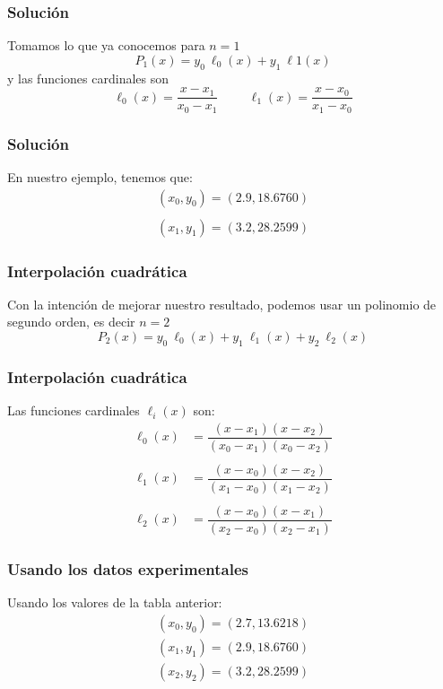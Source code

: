 \begin{frame}[fragile]
\frametitle{Solución}
Tomamos lo que ya conocemos para $n=1$
\[P_{1}(x) = y_{0} \: \ell_{0}(x) + y_{1} \: \ell{1}(x) \]
\pause
y las funciones cardinales son
\[ \ell_{0}(x) = \dfrac{x - x_{1}}{x_{0} - x_{1}} \hspace{1cm} \ell_{1}(x) = \dfrac{x - x_{0}}{x_{1} - x_{0}} \]
\end{frame}
\begin{frame}[fragile]
\frametitle{Solución}
En nuestro ejemplo, tenemos que:
\begin{align*}
(x_{0}, y_{0}) = (2.9, 18.6760) \\
\\
(x_{1}, y_{1}) = (3.2, 28.2599)
\end{align*}
\end{frame}
\begin{frame}
\frametitle{Interpolación cuadrática}
Con la intención de mejorar nuestro resultado, podemos usar un polinomio de segundo orden, es decir $n = 2$
\[P_{2}(x) = y_{0} \: \ell_{0}(x) + y_{1} \: \ell_{1}(x) + y_{2} \: \ell_{2}(x) \]
\end{frame}
\begin{frame}
\frametitle{Interpolación cuadrática}
Las funciones cardinales $\ell_{i}(x)$ son:
\begin{align*}
\ell_{0}(x) &= \dfrac{(x - x_{1})(x - x_{2})}{(x_{0} - x_{1})(x_{0} - x_{2})} \\
\\
\ell_{1}(x) &= \dfrac{(x - x_{0})(x - x_{2})}{(x_{1} - x_{0})(x_{1} - x_{2})} \\
\\
\ell_{2}(x) &= \dfrac{(x - x_{0})(x - x_{1})}{(x_{2} - x_{0})(x_{2} - x_{1})} 
\end{align*}
\end{frame}
\begin{frame}
\frametitle{Usando los datos experimentales}
Usando los valores de la tabla anterior:
\begin{eqnarray*}
(x_{0}, y_{0}) = (2.7, 13.6218) \\
(x_{1}, y_{1}) = (2.9, 18.6760) \\
(x_{2}, y_{2}) = (3.2, 28.2599)
\end{eqnarray*}
\\
\bigskip
{}
\end{frame}
